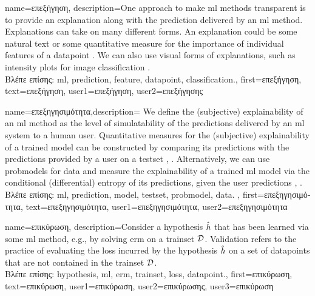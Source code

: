 {name={\foreignlanguage{greek}{επεξήγηση}},
	description={One approach to make \gls{ml} methods transparent is to provide an 
		explanation along with the \gls{prediction} delivered by an 
		\gls{ml} method. Explanations can take on many different forms. An explanation 
		could be some natural text or some quantitative measure for the importance 
		of individual \gls{feature}s of a \gls{datapoint} \cite{Molnar2019}. We can also 
		use visual forms of explanations, such as intensity plots for image \gls{classification} \cite{GradCamPaper}.\\
		\foreignlanguage{greek}{Βλέπε επίσης:} \gls{ml}, \gls{prediction}, \gls{feature}, \gls{datapoint}, \gls{classification}.},
	first={\foreignlanguage{greek}{επεξήγηση}},
	text={\foreignlanguage{greek}{επεξήγηση}},
	user1={\foreignlanguage{greek}{επεξήγηση}}, %
    	user2={\foreignlanguage{greek}{επεξήγησης}} %
}

{name={\foreignlanguage{greek}{επεξηγησιμότητα}},description=
		{We define the (subjective) explainability of an \gls{ml} method 
			as the level of simulatability \cite{Colin:2022aa} of the \gls{prediction}s 
			delivered by an \gls{ml} system to a human user. Quantitative measures for the 
			(subjective) explainability of a trained \gls{model} can be constructed by 
			comparing its \gls{prediction}s with the \gls{prediction}s provided by a user 
			on a \gls{testset} \cite{Colin:2022aa}, \cite{Zhang:2024aa}. Alternatively, we can use 
			\gls{probmodel}s for \gls{data} and measure the explainability of a trained \gls{ml} 
			\gls{model} via the conditional (differential) entropy of its \gls{prediction}s, given the user \gls{prediction}s \cite{JunXML2020}, \cite{Chen2018}.\\
		\foreignlanguage{greek}{Βλέπε επίσης:} \gls{ml}, \gls{prediction}, \gls{model}, \gls{testset}, \gls{probmodel}, \gls{data}. 
		},
		first={\foreignlanguage{greek}{επεξηγησιμότητα}},
		text={\foreignlanguage{greek}{επεξηγησιμότητα}},
		user1={\foreignlanguage{greek}{επεξηγησιμότητα}}, %
		user2={\foreignlanguage{greek}{επεξηγησιμότητα}} %
}

{name={\foreignlanguage{greek}{επικύρωση}},
	description={Consider a \gls{hypothesis} $\hat{h}$ that has been 
		learned via some \gls{ml} method, e.g., by solving \gls{erm} on a \gls{trainset} $\mathcal{D}$. 
		Validation refers to the practice of evaluating the \gls{loss} incurred by the 
		\gls{hypothesis} $\hat{h}$ on a set of 
		\gls{datapoint}s that are not contained in the \gls{trainset} $\mathcal{D}$.\\
		\foreignlanguage{greek}{Βλέπε επίσης:} \gls{hypothesis}, \gls{ml}, \gls{erm}, \gls{trainset}, \gls{loss}, \gls{datapoint}.},
		first={\foreignlanguage{greek}{επικύρωση}},
		text={\foreignlanguage{greek}{επικύρωση}},
		user1={\foreignlanguage{greek}{επικύρωση}}, %
		user2={\foreignlanguage{greek}{επικύρωσης}}, %
		user3={\foreignlanguage{greek}{επικύρωση}} %
}

